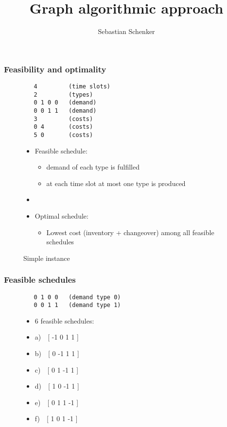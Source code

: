 \documentclass{beamer}
\title{Graph algorithmic approach}
\author{Sebastian Schenker}
\date{}
\begin{document}
\frame{\titlepage}

\begin{frame}[fragile]
  \frametitle{Feasibility and optimality}
  \begin{figure}
    \begin{minipage}{0.45\textwidth}
          \caption{Simple instance}
\begin{verbatim}
   4         (time slots)
   2         (types)
   0 1 0 0   (demand)
   0 0 1 1   (demand)
   3         (costs)
   0 4       (costs)
   5 0       (costs)
\end{verbatim}
    \end{minipage}
    \hfill
    \begin{minipage}{0.45\textwidth}
      \begin{itemize}
    \item Feasible schedule:
      \begin{itemize}
      \item demand of each type is fulfilled
      \item at each time slot at most one type is produced
      \end{itemize}
    \item[]
    \item Optimal schedule:
      \begin{itemize}
      \item Lowest cost (inventory + changeover) among all
        feasible schedules
      \end{itemize}
    \end{itemize}
  \end{minipage}
\end{figure}
\end{frame}

\begin{frame}[fragile]
  \frametitle{Feasible schedules}
  \begin{figure}
    \begin{minipage}{0.45\textwidth}
\begin{verbatim}
   0 1 0 0   (demand type 0)
   0 0 1 1   (demand type 1)
\end{verbatim}
    \end{minipage}
    \hfill
    \begin{minipage}{0.45\textwidth}
      \begin{itemize}
      \item 6 feasible schedules:
      \item[] a)~~[ -1 0 1 1 ]
      \item[] b)~~[ 0 -1 1 1 ]
      \item[] c)~~[ 0 1 -1 1 ]
      \item[] d)~~[ 1 0 -1 1 ]
      \item[] e)~~[ 0 1 1 -1 ]
      \item[] f)~~[ 1 0 1 -1 ]
      \end{itemize}
    \end{minipage}
  \end{figure}
\end{frame}
\end{document}
